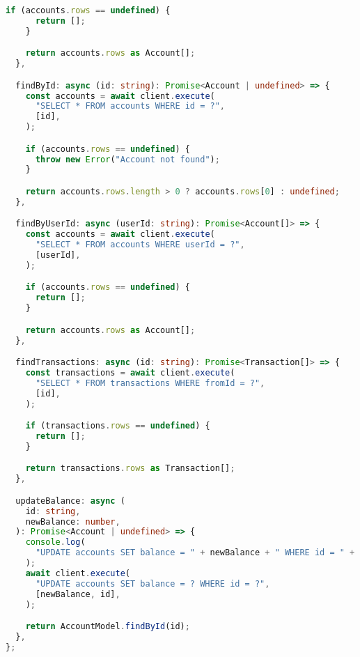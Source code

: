 \begin{lstlisting}[language=TypeScript]
    if (accounts.rows == undefined) {
      return [];
    }

    return accounts.rows as Account[];
  },

  findById: async (id: string): Promise<Account | undefined> => {
    const accounts = await client.execute(
      "SELECT * FROM accounts WHERE id = ?",
      [id],
    );

    if (accounts.rows == undefined) {
      throw new Error("Account not found");
    }

    return accounts.rows.length > 0 ? accounts.rows[0] : undefined;
  },

  findByUserId: async (userId: string): Promise<Account[]> => {
    const accounts = await client.execute(
      "SELECT * FROM accounts WHERE userId = ?",
      [userId],
    );

    if (accounts.rows == undefined) {
      return [];
    }

    return accounts.rows as Account[];
  },

  findTransactions: async (id: string): Promise<Transaction[]> => {
    const transactions = await client.execute(
      "SELECT * FROM transactions WHERE fromId = ?",
      [id],
    );

    if (transactions.rows == undefined) {
      return [];
    }

    return transactions.rows as Transaction[];
  },

  updateBalance: async (
    id: string,
    newBalance: number,
  ): Promise<Account | undefined> => {
    console.log(
      "UPDATE accounts SET balance = " + newBalance + " WHERE id = " + id,
    );
    await client.execute(
      "UPDATE accounts SET balance = ? WHERE id = ?",
      [newBalance, id],
    );

    return AccountModel.findById(id);
  },
};
\end{lstlisting}

